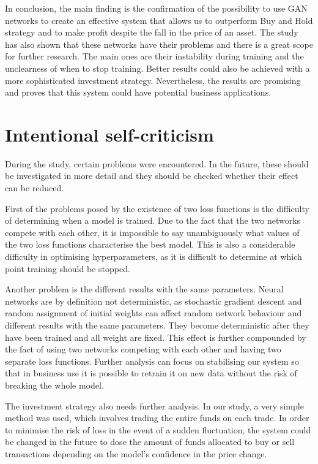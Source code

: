 \documentclass[11pt]{article} %
\begin{document}
In conclusion, the main finding is the confirmation of the possibility to use GAN networks to create an effective system that allows us to outperform Buy and Hold strategy and to make profit despite the fall in the price of an asset. The study has also shown that these networks have their problems and there is a great scope for further research. The main ones are their instability during training and the unclearness of when to stop training.  Better results could also be achieved with a more sophisticated investment strategy. Nevertheless, the results are promising and proves that this system could have potential business applications.

\section{Intentional self-criticism}
During the study, certain problems were encountered. In the future, these should be investigated in more detail and they should be checked
whether their effect can be reduced.

First of the problems posed by the existence of two loss functions is the difficulty of determining when a model is trained. Due to the fact that the two networks compete with each other, it is impossible to say unambiguously what values of the two loss functions characterise the best model. This is also a considerable difficulty in optimising hyperparameters, as it is difficult to determine at which point training should be stopped. 

Another problem is the different results with the same parameters. Neural networks are by definition not deterministic, as stochastic gradient descent and random assignment of initial weights can affect random network behaviour and different results with the same parameters. They become deterministic after they have been trained and all weight are fixed. This effect is further compounded by the fact of using two networks competing with each other and having two separate loss functions. Further analysis can focus on stabilising our system so that in business use it is possible to retrain it on new data without the risk of breaking the whole model. 

The investment strategy also needs further analysis. In our study, a very simple method was used, which involves trading the entire funds on each trade. In order to minimise the risk of loss in the event of a sudden fluctuation, the system could be changed in the future to dose the amount of funds allocated to buy or sell transactions depending on the model's confidence in the price change. 
\end{document}

